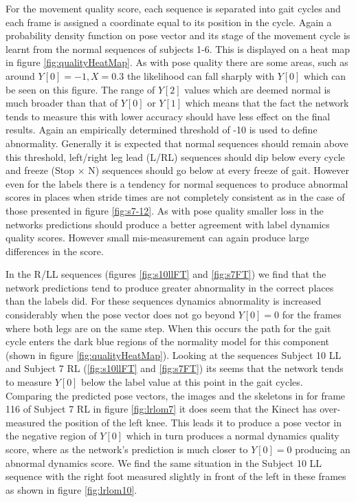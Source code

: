 \documentclass[11pt]{article} %
\begin{document}
For the movement quality score, each sequence is separated into gait cycles and each frame is assigned a coordinate equal to its position in the cycle. Again a probability density function on pose vector and its stage of the movement cycle is learnt from the normal sequences of subjects 1-6. This is displayed on a heat map in figure \ref{fig:qualityHeatMap}. As with pose quality there are some areas, such as around $Y[0]=-1,X=0.3$ the likelihood can fall sharply with $Y[0]$ which can be seen on this figure. The range of $Y[2]$ values which are deemed normal is much broader than that of $Y[0]$ or $Y[1]$ which means that the fact the network tends to measure this with lower accuracy should have less effect on the final results. Again an empirically determined threshold of -10 is used to define abnormality. Generally it is expected that normal sequences should remain above this threshold, left/right leg lead (L/RL) sequences should dip below every cycle and freeze (Stop $\times$ N) sequences should go below at every freeze of gait. However even for the labels there is a tendency for normal sequences to produce abnormal scores in places when stride times are not completely consistent as in the case of those presented in figure \ref{fig:s7-12}. As with pose quality smaller loss in the networks predictions should produce a better agreement with label dynamics quality scores. However small mis-measurement can again produce large differences in the score. 

In the R/LL sequences (figures \ref{fig:s10llFT} and \ref{fig:s7FT}) we find that the network predictions tend to produce greater abnormality in the correct places than the labels did. For these sequences dynamics abnormality is increased considerably when the pose vector does not go beyond $Y[0]=0$ for the frames where both legs are on the same step. When this occurs the path for the gait cycle enters the dark blue regions of the normality model for this component (shown in figure \ref{fig:qualityHeatMap}). Looking at the sequences Subject 10 LL and Subject 7 RL (\ref{fig:s10llFT} and \ref{fig:s7FT}) its seems that the network tends to measure $Y[0]$ below the label value at this point in the gait cycles. Comparing the predicted pose vectors, the images and the skeletons in for frame 116 of Subject 7 RL in figure \ref{fig:lrlom7} it does seem that the Kinect has over-measured the position of the left knee. This leads it to produce a pose vector in the negative region of $Y[0]$ which in turn produces a normal dynamics quality score, where as the network's prediction is much closer to $Y[0]=0$ producing an abnormal dynamics score. We find the same situation in the Subject 10 LL sequence with the right foot measured slightly in front of the left in these frames as shown in figure \ref{fig:lrlom10}. 
\end{document}
